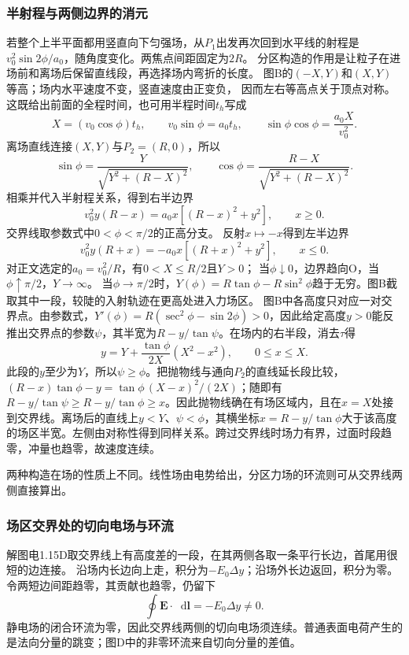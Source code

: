 \documentclass[UTF8,fontset=fandol,a4paper,11pt]{ctexart}
\newcommand{\dd}{\mathop{}\!\mathrm{d}}
\begin{document}
\subsubsection*{半射程与两侧边界的消元}
若整个上半平面都用竖直向下匀强场，从$P_1$出发再次回到水平线的射程是
$v_0^2\sin2\phi/a_0$，随角度变化。两焦点间距固定为$2R$。
分区构造的作用是让粒子在进场前和离场后保留直线段，再选择场内弯折的长度。
图B的$(-X,Y)$和$(X,Y)$等高；场内水平速度不变，竖直速度由正变负，
因而左右等高点关于顶点对称。这既给出前面的全程时间，也可用半程时间$t_h$写成
\[
X=(v_0\cos\phi)t_h,\qquad v_0\sin\phi=a_0t_h,
\qquad\sin\phi\cos\phi=\frac{a_0X}{v_0^2}.
\]
离场直线连接$(X,Y)$与$P_2=(R,0)$，所以
\[
\sin\phi=\frac{Y}{\sqrt{Y^2+(R-X)^2}},\qquad
\cos\phi=\frac{R-X}{\sqrt{Y^2+(R-X)^2}}.
\]
相乘并代入半射程关系，得到右半边界
\[
v_0^2y(R-x)=a_0x[(R-x)^2+y^2],\qquad x\ge0.
\]
交界线取参数式中$0<\phi<\pi/2$的正高分支。
反射$x\mapsto-x$得到左半边界
\[
v_0^2y(R+x)=-a_0x[(R+x)^2+y^2],\qquad x\le0.
\]
对正文选定的$a_0=v_0^2/R$，有$0<X\le R/2$且$Y>0$；
当$\phi\downarrow0$，边界趋向O，当$\phi\uparrow\pi/2$，$Y\to\infty$。
当$\phi\to\pi/2$时，$Y(\phi)=R\tan\phi-R\sin^2\phi$趋于无穷。图B截取其中一段，较陡的入射轨迹在更高处进入力场区。
图B中各高度只对应一对交界点。由参数式，$Y'(\phi)=R(\sec^2\phi-\sin2\phi)>0$，因此给定高度$y>0$能反推出交界点的参数$\psi$，其半宽为$R-y/\tan\psi$。在场内的右半段，消去$\tau$得
\[
y=Y+\frac{\tan\phi}{2X}(X^2-x^2),\qquad 0\le x\le X.
\]
此段的$y$至少为$Y$，所以$\psi\ge\phi$。把抛物线与通向$P_2$的直线延长段比较，$(R-x)\tan\phi-y=\tan\phi\,(X-x)^2/(2X)$；随即有$R-y/\tan\psi\ge R-y/\tan\phi\ge x$。因此抛物线确在有场区域内，且在$x=X$处接到交界线。离场后的直线上$y<Y$、$\psi<\phi$，其横坐标$x=R-y/\tan\phi$大于该高度的场区半宽。左侧由对称性得到同样关系。跨过交界线时场力有界，过面时段趋零，冲量也趋零，故速度连续。

两种构造在场的性质上不同。线性场由电势给出，分区力场的环流则可从交界线两侧直接算出。
\subsubsection*{场区交界处的切向电场与环流}
解图电1.15D取交界线上有高度差的一段，在其两侧各取一条平行长边，首尾用很短的边连接。
沿场内长边向上走，积分为$-E_0\Delta y$；沿场外长边返回，积分为零。
令两短边间距趋零，其贡献也趋零，仍留下
\[
\oint\boldsymbol E\cdot\dd\boldsymbol l=-E_0\Delta y\ne0.
\]
静电场的闭合环流为零，因此交界线两侧的切向电场须连续。普通表面电荷产生的是法向分量的跳变；图D中的非零环流来自切向分量的差值。
\end{document}
